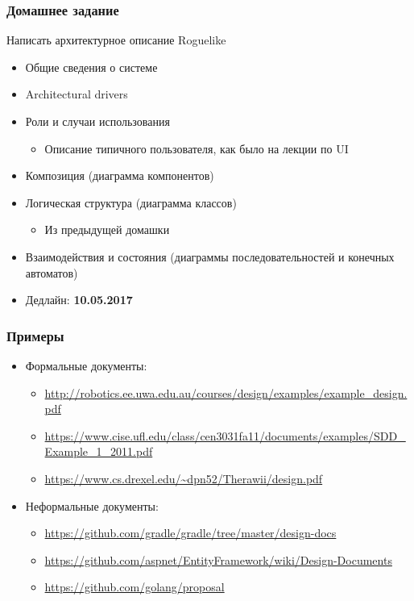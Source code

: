 \documentclass[xetex,mathserif,serif]{beamer}
\begin{document}
	\begin{frame}
		\frametitle{Домашнее задание}
		Написать архитектурное описание Roguelike
		\begin{itemize}
			\item Общие сведения о системе
			\item Architectural drivers
			\item Роли и случаи использования
			\begin{itemize}
				\item Описание типичного пользователя, как было на лекции по UI
			\end{itemize}
			\item Композиция (диаграмма компонентов)
			\item Логическая структура (диаграмма классов)
			\begin{itemize}
				\item Из предыдущей домашки
			\end{itemize}
			\item Взаимодействия и состояния (диаграммы последовательностей и конечных автоматов)
			\item Дедлайн: \textbf{10.05.2017}
		\end{itemize}
	\end{frame}

	\begin{frame}
		\frametitle{Примеры}
		\begin{itemize}
			\item Формальные документы:
			\begin{itemize}
				\item \url{http://robotics.ee.uwa.edu.au/courses/design/examples/example\_design.pdf}
				\item \url{https://www.cise.ufl.edu/class/cen3031fa11/documents/examples/SDD\_Example\_1\_2011.pdf}
				\item \url{https://www.cs.drexel.edu/~dpn52/Therawii/design.pdf}
			\end{itemize}
			\item Неформальные документы:
			\begin{itemize}
				\item \url{https://github.com/gradle/gradle/tree/master/design-docs}
				\item \url{https://github.com/aspnet/EntityFramework/wiki/Design-Documents}
				\item \url{https://github.com/golang/proposal}
			\end{itemize}
		\end{itemize}
	\end{frame}
\end{document}
